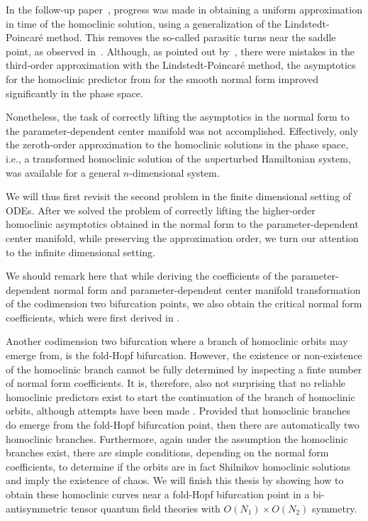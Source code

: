 In the follow-up paper~\cite{Al-Hdaibat2016}, progress was made in obtaining a
uniform approximation in time of the homoclinic solution, using a generalization
of the Lindstedt-Poincar\'e method. This removes the so-called parasitic turns
near the saddle point, as observed in~\cite{Kuznetsov2014improved}. Although, as
pointed out by~\cite{Algaba_2019}, there were mistakes in the third-order
approximation with the Lindstedt-Poincar\'e method, the asymptotics for the
homoclinic predictor from \cite{Kuznetsov2014improved} for the smooth normal form
improved significantly in the phase space.

Nonetheless, the task of correctly lifting the asymptotics in the normal form to
the parameter-dependent center manifold was not accomplished. Effectively, only
the zeroth-order approximation to the homoclinic solutions in the phase space,
i.e., a transformed homoclinic solution of the \emph{un}perturbed Hamiltonian
system, was available for a general $n$-dimensional system.

We will thus first revisit the second problem in the finite dimensional setting
of ODEs. After we solved the problem of correctly lifting the higher-order
homoclinic asymptotics obtained in the normal form to the parameter-dependent
center manifold, while preserving the approximation order, we turn our attention
to the infinite dimensional setting. 

We should remark here that while deriving the coefficients of the
parameter-dependent normal form and parameter-dependent center manifold
transformation of the codimension two bifurcation points, we also obtain the
critical normal form coefficients, which were first derived in
\cite{Janssens:Thesis}.

Another codimension two bifurcation where a branch of homoclinic orbits may
emerge from, is the fold-Hopf bifurcation. However, the existence or non-existence
of the homoclinic branch cannot be fully determined by inspecting a finte number
of normal form coefficients. It is, therefore, also not surprising that no reliable
homoclinic predictors exist to start the continuation of the branch of homoclinic
orbits, although attempts have been made \cite{Budac:Thesis}. Provided that
homoclinic branches do emerge from the fold-Hopf bifurcation point, then there
are automatically two homoclinic branches. Furthermore, again under the
assumption the homoclinic branches exist, there are simple conditions, depending
on the normal form coefficients, to determine if the orbits are in fact Shilnikov
homoclinic solutions \cite{baldoma2020hopf} and imply the existence of chaos. We
will finish this thesis by showing how to obtain these homoclinic curves near a
fold-Hopf bifurcation point in a bi-antisymmetric tensor quantum field theories
with $O(N_1)\times O(N_2)$ symmetry.

